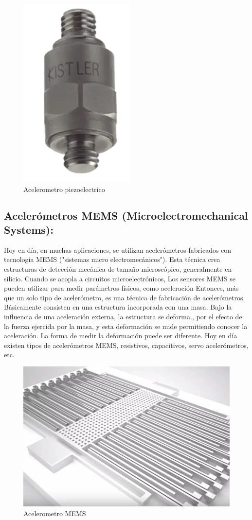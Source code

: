 \begin{figure}[h]
	\centering
	\includegraphics[width=0.5\linewidth]{img/Acelerometro piezoelectrico.png}
	\caption{Acelerometro piezoelectrico}
	\label{fig:insertarimagen}
\end{figure}


\subsection{Acelerómetros MEMS (Microelectromechanical Systems): }
Hoy en día, en muchas aplicaciones, se utilizan acelerómetros fabricados con tecnología MEMS ("sistemas micro electromecánicos").
Esta técnica crea estructuras de detección mecánica de tamaño microscópico, generalmente en silicio. Cuando se acopla a circuitos microelectrónicos, Los sensores MEMS se pueden utilizar para medir parámetros físicos, como aceleración
Entonces, más que un solo tipo de acelerómetro, es una técnica de fabricación de acelerómetros.
Básicamente consisten en una estructura incorporada con una masa. Bajo la influencia de una aceleración externa, la estructura se deforma., por el efecto de la fuerza ejercida por la masa, y esta deformación se mide permitiendo conocer la aceleración.
La forma de medir la deformación puede ser diferente. Hoy en día existen tipos de acelerómetros MEMS, resistivos, capacitivos, servo acelerómetros, etc.

\begin{figure}[h]
	\centering
	\includegraphics[width=0.7\linewidth]{img/acelerometros MEMS.png}
	\caption{Acelerometro MEMS}
	\label{fig:insertarimagen}
\end{figure}

